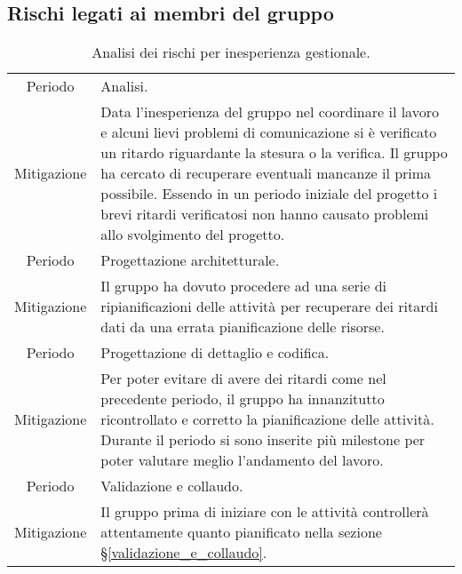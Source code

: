 \subsection{Rischi legati ai membri del gruppo}
\begin{table}[H]
	\centering
    \begin{tabular}{|c|p{11.5cm}|}
    \rowcolor{darkblue} \hline
    \multicolumn{2}{|c|}{\textcolor{white}{\textbf{RG1 - Inesperienza gestionale}}}\\ \hline
    Periodo & Analisi.\\ \hline
    Mitigazione & Data l'inesperienza del gruppo nel coordinare il lavoro e alcuni lievi problemi di comunicazione si è verificato un ritardo riguardante la stesura o la verifica. Il gruppo ha cercato di recuperare eventuali mancanze il prima possibile. Essendo in un periodo iniziale del progetto i brevi ritardi verificatosi non hanno causato problemi allo svolgimento del progetto.\\ \hline
    Periodo & Progettazione architetturale.\\ \hline
    Mitigazione & Il gruppo ha dovuto procedere ad una serie di ripianificazioni delle attività per recuperare dei ritardi dati da una errata pianificazione delle risorse.\\ \hline
    Periodo & Progettazione di dettaglio e codifica.\\ \hline
    Mitigazione & Per poter evitare di avere dei ritardi come nel precedente periodo, il gruppo ha innanzitutto ricontrollato e corretto la pianificazione delle attività. Durante il periodo si sono inserite più milestone per poter valutare meglio l'andamento del lavoro.\\ \hline
    Periodo & Validazione e collaudo.\\ \hline
    Mitigazione & Il gruppo prima di iniziare con le attività controllerà attentamente quanto pianificato nella sezione \S\ref{validazione_e_collaudo}.\\ \hline
    \end{tabular}
    \caption{\label{tab:ARG3}Analisi dei rischi per inesperienza gestionale.}
\end{table}
